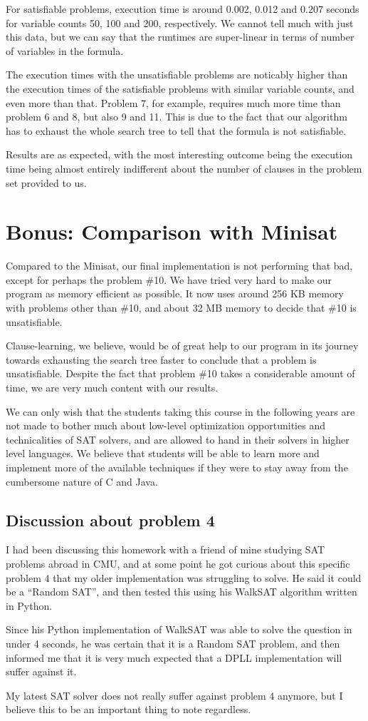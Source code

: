 \documentclass{article}
\begin{document}
For satisfiable problems, execution time is around
0.002, 0.012 and 0.207 seconds for variable counts
50, 100 and 200, respectively. We cannot tell much
with just this data, but we can say that the runtimes
are super-linear in terms of number of variables in
the formula.

The execution times with the unsatisfiable problems are noticably
higher than the execution times of the satisfiable problems with
similar variable counts, and even more than that. Problem 7,
for example, requires much more time than problem 6 and 8,
but also 9 and 11. This is due to the fact that our algorithm
has to exhaust the whole search tree to tell that the formula
is not satisfiable.

Results are as expected, with the most interesting outcome
being the execution time being almost entirely indifferent
about the number of clauses in the problem set provided to us.

\section{Bonus: Comparison with Minisat}

Compared to the Minisat, our final implementation is not
performing that bad, except for perhaps the problem \#10.
We have tried very hard to make our program as memory
efficient as possible. It now uses around 256 KB memory with
problems other than \#10, and about 32 MB memory to
decide that \#10 is unsatisfiable.

Clause-learning, we believe, would be of great help to our
program in its journey towards exhausting the search
tree faster to conclude that a problem is unsatisfiable.
Despite the fact that problem \#10 takes a considerable
amount of time, we are very much content with our results.

We can only wish that the students taking this course in
the following years are not made to bother much about
low-level optimization opportunities and technicalities
of SAT solvers, and are allowed to hand in their
solvers in higher level languages. We believe that
students will be able to learn more and implement more
of the available techniques if they were to stay away
from the cumbersome nature of C and Java.

\subsection{Discussion about problem 4}

I had been discussing this homework with a friend of mine
studying SAT problems abroad in CMU, and at some point
he got curious about this specific problem 4 that my older
implementation was struggling to solve. He said it could
be a ``Random SAT'', and then tested this using
his WalkSAT algorithm written in Python.

Since his Python implementation of WalkSAT was able to
solve the question in under 4 seconds, he was certain
that it is a Random SAT problem, and then informed me
that it is very much expected that a DPLL implementation
will suffer against it.

My latest SAT solver does not really suffer against
problem 4 anymore, but I believe this to be an important
thing to note regardless.
\end{document}
